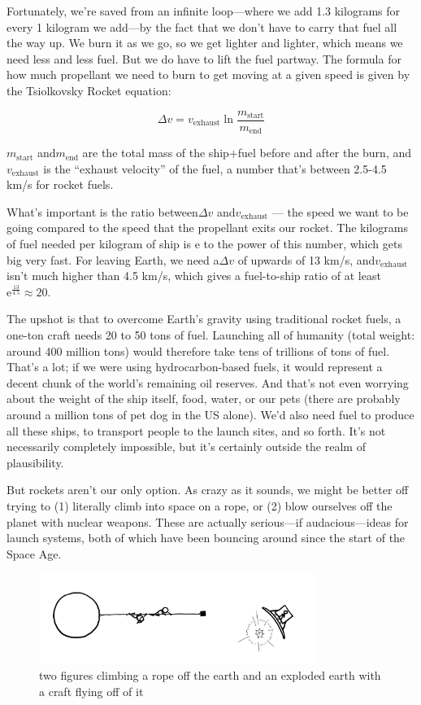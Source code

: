 {Fortunately, we’re saved from an infinite loop—where we add 1.3 kilograms for every 1 kilogram we add—by the fact that we don’t have to carry that fuel all the way up. We burn it as we go, so we get lighter and lighter, which means we need less and less fuel. But we do have to lift the fuel partway. The formula for how much propellant we need to burn to get moving at a given speed is given by the Tsiolkovsky Rocket equation:}

{\[\Delta v = v_\text{exhaust}\ln\frac {m_\text{start}} {m_\text{end}}\]}

{\(m_\text{start}\) and\(m_\text{end}\) are the total mass of the ship+fuel before and after the burn, and\(v_\text{exhaust}\) is the “exhaust velocity” of the fuel, a number that’s between 2.5-4.5 km/s for rocket fuels.}

{What’s important is the ratio between\(\Delta v\) and\(v_\text{exhaust}\) — the speed we want to be going compared to the speed that the propellant exits our rocket. The kilograms of fuel needed per kilogram of ship is e to the power of this number, which gets big very fast. For leaving Earth, we need a\(\Delta v\) of upwards of 13 km/s, and\(v_\text{exhaust}\) isn’t much higher than 4.5 km/s, which gives a fuel-to-ship ratio of at least\(\text{e}^{\frac{13}{4.5}}\approx 20\).}

{The upshot is that to overcome Earth’s gravity using traditional rocket fuels, a one-ton craft needs 20 to 50 tons of fuel. Launching all of humanity (total weight: around 400 million tons) would therefore take tens of trillions of tons of fuel. That’s a lot; if we were using hydrocarbon-based fuels, it would represent a decent chunk of the world’s remaining oil reserves. And that’s not even worrying about the weight of the ship itself, food, water, or our pets (there are probably around a million tons of pet dog in the US alone). We’d also need fuel to produce all these ships, to transport people to the launch sites, and so forth. It’s not necessarily completely impossible, but it’s certainly outside the realm of plausibility.}

{But rockets aren’t our only option. As crazy as it sounds, we might be better off trying to (1) literally climb into space on a rope, or (2) blow ourselves off the planet with nuclear weapons. These are actually serious—if audacious—ideas for launch systems, both of which have been bouncing around since the start of the Space Age.}

\begin{figure}[!htbp]
\centering
\includegraphics[scale=0.5, max width=0.8\textwidth]{imgs/a/7/everybody_out_crazy.png}
\caption{two figures climbing a rope off the earth and an exploded earth with a craft flying off of it}
\end{figure}

